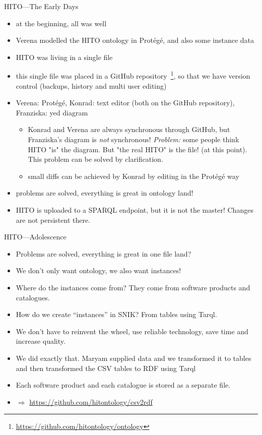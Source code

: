 \documentclass[aspectratio=1610]{beamer}
\begin{document}
\begin{frame}{HITO---The Early Days}
\begin{itemize}
  \item at the beginning, all was well
  \item Verena modelled the HITO ontology in Protégé, and also some instance data
  \item HITO was living in a single file
  \item this single file was placed in a GitHub repository~\footnote{\url{https://github.com/hitontology/ontology}}, so that we have version control (backups, history and multi user editing)
  \item Verena: Protégé, Konrad: text editor (both on the GitHub repository), Franziska: yed diagram
\begin{itemize}
  \item Konrad and Verena are always synchronous through GitHub, but Franziska's diagram is \emph{not} synchronous! \emph{Problem:} some people think HITO "is" the diagram. But "the real HITO" is the file! (at this point). This problem can be solved by clarification.
  \item small diffs can be achieved by Konrad by editing in the Protégé way
\end{itemize}
  \item problems are solved, everything is great in ontology land!
  \item HITO is uploaded to a SPARQL endpoint, but it is not the master! Changes are not persistent there.
\end{itemize}
\end{frame}

\begin{frame}{HITO---Adolescence}
\begin{itemize}
  \item Problems are solved, everything is great in one file land?
  \item We don't only want ontology, we also want instances!
  \item Where do the instances come from? They come from software products and catalogues.
  \item How do we create \enquote{instances} in SNIK? From tables using Tarql.
  \item We don't have to reinvent the wheel, use reliable technology, save time and increase quality. 
  \item We did exactly that. Maryam supplied data and we transformed it to tables and then transformed the CSV tables to RDF using Tarql
  \item Each software product and each catalogue is stored as a separate file.
  \item $\Rightarrow$ \url{https://github.com/hitontology/csv2rdf} 
\end{itemize}
\end{frame}
\end{document}
